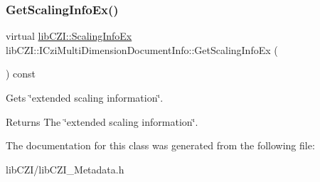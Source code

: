 \subsubsection{\texorpdfstring{Get\+Scaling\+Info\+Ex()}{GetScalingInfoEx()}}
{\footnotesize\ttfamily virtual \hyperlink{structlib_c_z_i_1_1_scaling_info_ex}{lib\+C\+Z\+I\+::\+Scaling\+Info\+Ex} lib\+C\+Z\+I\+::\+I\+Czi\+Multi\+Dimension\+Document\+Info\+::\+Get\+Scaling\+Info\+Ex (\begin{DoxyParamCaption}{ }\end{DoxyParamCaption}) const\hspace{0.3cm}{\ttfamily [pure virtual]}}

Gets \char`\"{}extended scaling information\char`\"{}. \begin{DoxyReturn}{Returns}
The \char`\"{}extended scaling information\char`\"{}. 
\end{DoxyReturn}


The documentation for this class was generated from the following file\+:\begin{DoxyCompactItemize}
\item 
lib\+C\+Z\+I/lib\+C\+Z\+I\+\_\+\+Metadata.\+h\end{DoxyCompactItemize}
